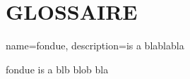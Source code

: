 \chapter*{GLOSSAIRE}

{
	name=fondue,
	description={is a blablabla}
}
\printacronyms

\Gls{fondue} is a blb blob bla

